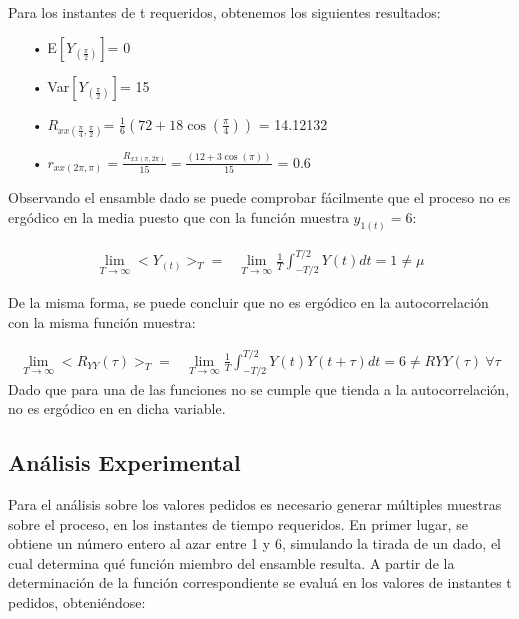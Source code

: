 Para los instantes de t requeridos, obtenemos los siguientes resultados:
\begin{enumerate}
	\item[•]E$\left[ Y_{(\frac{\pi}{2})}\right]$= 0 
	\item[•]Var$\left[Y_{(\frac{\pi}{2})}\right]$= 15
	\item[•]$R_{xx(\frac{\pi}{4},\frac{\pi}{2})}$= $\frac{1}{6} (72 + 18 \cos(\frac{\pi}{4}))$ = 14.12132
	\item[•]$r_{xx(2\pi,\pi)} = \frac{R_{xx(\pi,2\pi)}}{15} = \frac{ (12 + 3 \cos(\pi))}{15}$ = 0.6 \\
\end{enumerate}

Observando el ensamble dado se puede comprobar fácilmente que el proceso no es ergódico en la media puesto que con la función muestra $y_{1(t)} = 6$:

\begin{equation*}
\begin{split}
	\lim_{T\to\infty} < Y_{(t)} >_T = & \lim_{T\to\infty} \frac{1}{T} \int_{-T/2}^{T/2} Y(t) dt = 1 \neq \mu 
\end{split}
\end{equation*}

De la misma forma, se puede concluir que no es ergódico en la autocorrelación con la misma función muestra:

\begin{equation*}
\begin{split}
	\lim_{T\to\infty} < R_{YY}(\tau) >_T = & \lim_{T\to\infty} \frac{1}{T} \int_{-T/2}^{T/2} Y(t) Y(t + \tau) dt = 6 \neq R{YY}(\tau) \ 	\forall \tau
\end{split}	
\end{equation*}
Dado que para una de las funciones no se cumple que tienda a la autocorrelación, no es ergódico en en dicha variable.\\


\subsection{Análisis Experimental}

Para el análisis sobre los valores pedidos es necesario generar múltiples muestras sobre el proceso, en los instantes de tiempo requeridos. En primer lugar, se obtiene un número entero al azar entre 1 y 6, simulando la tirada de un dado, el cual determina qué función miembro del ensamble resulta.
A partir de la determinación de la función correspondiente se evaluá en los valores de instantes t pedidos, obteniéndose:


